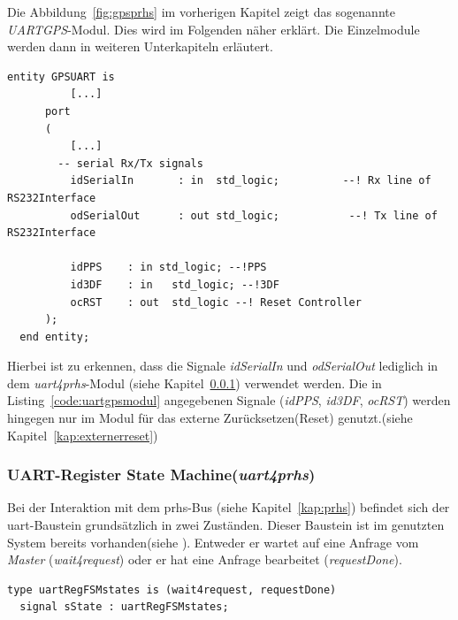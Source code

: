 Die Abbildung~\ref{fig:gpsprhs} im vorherigen Kapitel zeigt das sogenannte \emph{UARTGPS}-Modul. Dies wird im
Folgenden näher erklärt. Die Einzelmodule werden dann in weiteren Unterkapiteln erläutert. \\

\begin{lstlisting}[caption={Entity des \emph{UARTGPS}-Moduls},label={code:uartgpsmodul}]
  entity GPSUART is
          [...]
      port
      (
          [...]
        -- serial Rx/Tx signals
          idSerialIn       : in  std_logic;          --! Rx line of RS232Interface
          odSerialOut      : out std_logic;           --! Tx line of RS232Interface

          idPPS    : in std_logic; --!PPS
          id3DF    : in   std_logic; --!3DF
          ocRST    : out  std_logic --! Reset Controller
      );
  end entity;
\end{lstlisting}

Hierbei ist zu erkennen, dass die Signale \emph{idSerialIn} und \emph{odSerialOut} lediglich in dem
 \emph{uart4prhs}-Modul (siehe Kapitel~\ref{kap:uartrsm}) verwendet werden. Die in Listing~\ref{code:uartgpsmodul}
 angegebenen Signale (\emph{idPPS}, \emph{id3DF}, \emph{ocRST}) werden hingegen nur im Modul für das externe
 Zurücksetzen(Reset) genutzt.(siehe Kapitel~\ref{kap:externerreset})


\subsubsection{UART-Register State Machine(\emph{uart4prhs})}\label{kap:uartrsm}

Bei der Interaktion mit dem \ac{prhs}-Bus (siehe Kapitel~\ref{kap:prhs}) befindet sich der \ac{uart}-Baustein grundsätzlich in zwei Zuständen.
Dieser Baustein ist im genutzten System bereits vorhanden(siehe \cite{MEckertDiss}). Entweder er wartet auf eine Anfrage vom \emph{Master} (\emph{wait4request}) oder
er hat eine Anfrage bearbeitet (\emph{requestDone}).\\

\begin{lstlisting}[caption={Zustandsbeschreibung},label={code:zustand}]
  type uartRegFSMstates is (wait4request, requestDone)
  signal sState : uartRegFSMstates;

\end{lstlisting}

